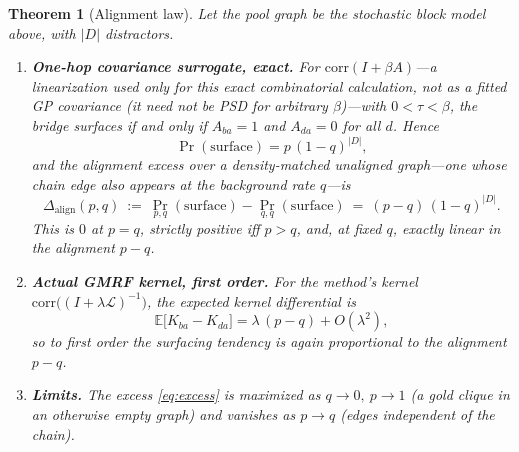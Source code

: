 \documentclass[11pt]{article}
\theoremstyle{plain}
\newtheorem{theorem}{Theorem}\newtheorem{lemma}{Lemma}\newtheorem{proposition}{Proposition}
\theoremstyle{definition}
\theoremstyle{remark}
\newcommand{\E}{\mathbb{E}}\newcommand{\R}{\mathbb{R}}\newcommand{\N}{\mathcal{N}}
\newcommand{\corr}{\mathrm{corr}}\newcommand{\GP}{\mathcal{GP}}\newcommand{\Var}{\mathrm{Var}}
\begin{document}
\begin{theorem}[Alignment law]\label{thm:align}
Let the pool graph be the stochastic block model above, with $|D|$ distractors.
\begin{enumerate}[topsep=2pt,itemsep=2pt,leftmargin=*]
\item[\textup{(i)}] \textbf{One-hop covariance surrogate, exact.} For $\corr(I+\beta A)$---a linearization used
only for this exact combinatorial calculation, not as a fitted GP covariance (it need not be PSD for arbitrary
$\beta$)---with $0<\tau<\beta$, the bridge surfaces if and only if $A_{ba}=1$ and $A_{da}=0$ for all $d$. Hence
\begin{equation}
\Pr(\text{surface})=p\,(1-q)^{|D|},
\end{equation}
and the \emph{alignment excess} over a density-matched unaligned graph---one whose chain edge also appears at the
background rate $q$---is
\begin{equation}
\Delta_{\mathrm{align}}(p,q)\ :=\ \Pr_{p,q}(\text{surface})-\Pr_{q,q}(\text{surface})\ =\ (p-q)\,(1-q)^{|D|}.
\label{eq:excess}
\end{equation}
This is $0$ at $p=q$, strictly positive iff $p>q$, and, at fixed $q$, exactly linear in the alignment $p-q$.
\item[\textup{(ii)}] \textbf{Actual GMRF kernel, first order.} For the method's kernel
$\corr\big((I+\lambda\mathcal L)^{-1}\big)$, the expected kernel differential is
\begin{equation}
\E\!\big[K_{ba}-K_{da}\big]=\lambda\,(p-q)+O(\lambda^2),
\end{equation}
so to first order the surfacing tendency is again proportional to the alignment $p-q$.
\item[\textup{(iii)}] \textbf{Limits.} The excess \eqref{eq:excess} is maximized as $q\to0,\ p\to1$ (a gold clique
in an otherwise empty graph) and vanishes as $p\to q$ (edges independent of the chain).
\end{enumerate}
\end{theorem}
\end{document}
